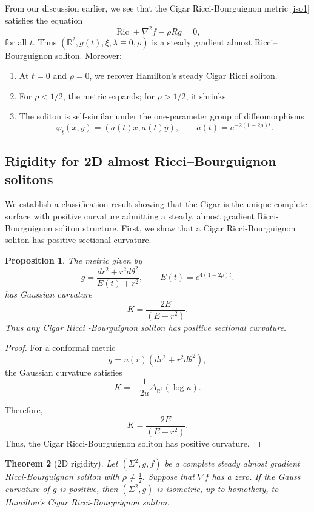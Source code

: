 \documentclass{article}
\newtheorem{theorem}{Theorem}[section]
\newtheorem{proposition}[theorem]{Proposition}
\theoremstyle{definition}
\theoremstyle{remark}
\begin{document}
From our discussion earlier, we see that the Cigar Ricci-Bourguignon metric \eqref{iso1}  satisfies the  equation 
\[
\operatorname{Ric} + \nabla^2 f - \rho R g = 0,
\]
for all $t$. Thus $(\mathbb{R}^2,g(t),\xi,\lambda\equiv 0,\rho)$ is a steady 
gradient almost Ricci--Bourguignon soliton.  Moreover:
\begin{enumerate}
\item At $t=0$ and $\rho=0$, we recover Hamilton's steady Cigar Ricci soliton.
\item For $\rho < 1/2$, the metric expands; for $\rho > 1/2$, it shrinks.
\item The soliton is self-similar under the one-parameter group of diffeomorphisms
\[
\varphi_t(x,y) = (a(t)x, a(t)y), \qquad a(t) = e^{-2(1-2\rho)t}.
\]
\end{enumerate}


\subsection{Rigidity for 2D almost Ricci--Bourguignon solitons}
We establish a classification result showing that the Cigar is the unique complete surface with positive curvature admitting a steady, almost gradient  Ricci-Bourguignon soliton structure.  First, we show that a Cigar Ricci-Bourguignon soliton has positive sectional curvature.

\begin{proposition}
The metric given by
\[
g = \frac{dr^2 + r^2 d\theta^2}{E(t) + r^2}, \qquad   E(t)=e^{4(1-2\rho)t}.
\]
has Gaussian curvature  
$$ K= \frac{2E}{(E+r^2)}.$$ Thus any Cigar Ricci 
-Bourguignon soliton has positive sectional curvature.
\end{proposition}

\begin{proof}
For a conformal metric
\[
g=u(r)(dr^2+r^2d\theta^2),
\]
the Gaussian curvature satisfies
\[
K
=
-\frac1{2u}
\Delta_{\mathbb R^2}(\log u).
\]

Therefore,
\[
K
=
\frac{2E}{(E+r^2)}.
\]
Thus, the Cigar Ricci-Bourguignon soliton has positive curvature.
\end{proof}



\begin{theorem}[2D rigidity]\label{2D rigidity}
Let $(\Sigma^2,g,f)$ be a complete steady almost gradient
Ricci-Bourguignon soliton with $\rho\neq \tfrac12$.  Suppose that $\nabla f$ has a zero.
If the Gauss curvature of $g$ is positive, then $(\Sigma^2,g)$ is isometric, up to homothety, to Hamilton's Cigar Ricci-Bourguignon soliton.
\end{theorem}
\end{document}
